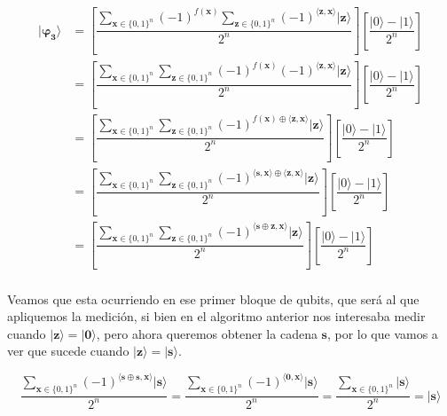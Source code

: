 \begin{itemize}
    \begin{equation}\label{eq:BV:phi3}
        \begin{split}\mathbf{|\varphi_{3}\rangle} &= \left[ \dfrac{\sum_{\mathbf{x} \in \{0,1\}^{n}}(-1)^{f(\mathbf{x})}\sum_{\mathbf{z} \in \{0,1\}^{n}}(-1)^{\langle\mathbf{z},\mathbf{x}\rangle}|\mathbf{z}\rangle}{2^{n}}\right] \left[ \dfrac{|0\rangle - |1\rangle}{2^{n}}\right] \\ &= \left[ \dfrac{\sum_{\mathbf{x} \in \{0,1\}^{n}}\sum_{\mathbf{z} \in \{0,1\}^{n}}(-1)^{f(\mathbf{x})}(-1)^{\langle\mathbf{z},\mathbf{x}\rangle}|\mathbf{z}\rangle}{2^{n}}\right] \left[ \dfrac{|0\rangle - |1\rangle}{2^{n}}\right] \\ &= \left[ \dfrac{\sum_{\mathbf{x} \in \{0,1\}^{n}}\sum_{\mathbf{z} \in \{0,1\}^{n}}(-1)^{f(\mathbf{x})\oplus\langle\mathbf{z},\mathbf{x}\rangle}|\mathbf{z}\rangle}{2^{n}}\right] \left[ \dfrac{|0\rangle - |1\rangle}{2^{n}}\right] \\  &= \left[ \dfrac{\sum_{\mathbf{x} \in \{0,1\}^{n}}\sum_{\mathbf{z} \in \{0,1\}^{n}}(-1)^{\langle\mathbf{s},\mathbf{x}\rangle\oplus\langle\mathbf{z},\mathbf{x}\rangle}|\mathbf{z}\rangle}{2^{n}}\right] \left[ \dfrac{|0\rangle - |1\rangle}{2^{n}}\right] \\ &= \left[ \dfrac{\sum_{\mathbf{x} \in \{0,1\}^{n}}\sum_{\mathbf{z} \in \{0,1\}^{n}}(-1)^{\langle\mathbf{s}\oplus \mathbf{z},\mathbf{x}\rangle}|\mathbf{z}\rangle}{2^{n}}\right] \left[ \dfrac{|0\rangle - |1\rangle}{2^{n}}\right] \\
        \end{split}
    \end{equation}
 \end{itemize}

 Veamos que esta ocurriendo en ese primer bloque de qubits, que será al que apliquemos la medición, si bien en el algoritmo anterior nos interesaba medir cuando $|\mathbf{z}\rangle=|\mathbf{0}\rangle$, pero ahora queremos obtener la cadena $\mathbf{s}$, por lo que vamos a ver que sucede cuando $|\mathbf{z}\rangle=|\mathbf{s}\rangle$.

 \begin{equation}
    \dfrac{\sum_{\mathbf{x} \in \{0,1\}^{n}}(-1)^{\langle\mathbf{s}\oplus \mathbf{s},\mathbf{x}\rangle}|\mathbf{s}\rangle}{2^{n}} = \dfrac{\sum_{\mathbf{x} \in \{0,1\}^{n}}(-1)^{\langle\mathbf{0},\mathbf{x}\rangle}|\mathbf{s}\rangle}{2^{n}}= \dfrac{\sum_{\mathbf{x} \in \{0,1\}^{n}}|\mathbf{s}\rangle}{2^{n}} = |\mathbf{s}\rangle
 \end{equation}

